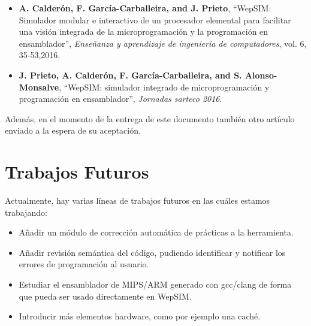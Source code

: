 \begin{itemize}

\item \textbf{A. Calderón, F. García-Carballeira, and J. Prieto}, “WepSIM: Simulador modular e interactivo de un procesador elemental para facilitar una visión integrada de la microprogramación y la programación en ensamblador”, \textit{Enseñanza y aprendizaje de ingeniería de computadores}, vol. 6, 35-53,2016. \cite{mateos2016wepsim}

\item \textbf{J. Prieto, A. Calderón, F. García-Carballeira, and S. Alonso-Monsalve}, “WepSIM: simulador integrado de microprogramación y programación en ensamblador”, \textit{Jornadas sarteco 2016}. \cite{arcos2032}

\end{itemize}

Además, en el momento de la entrega de este documento también otro artículo enviado a la espera de su aceptación.

\section{Trabajos Futuros}

Actualmente, hay varias líneas de trabajos futuros en las cuáles estamos trabajando:

\begin{itemize}

\item Añadir un módulo de corrección automática de prácticas a la herramienta.

\item Añadir revisión semántica del código, pudiendo identificar y notificar los errores de programación al usuario.

\item Estudiar el ensamblador de MIPS/ARM generado con gcc/clang de forma que pueda ser usado directamente en WepSIM.

\item Introducir más elementos hardware, como por ejemplo una caché.

\end{itemize}


